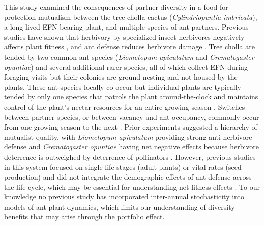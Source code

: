 \documentclass[11pt]{article}
\begin{document}
This study examined the consequences of partner diversity in a food-for-protection mutualism between the tree cholla cactus (\textit{Cylindriopuntia imbricata}), a long-lived EFN-bearing plant, and multiple species of ant partners.
Previous studies have shown that herbivory by specialized insect herbivores negatively affects plant fitness \cite{Miller2009}, and ant defense reduces herbivore damage \cite{Miller2007}. 
Tree cholla are tended by two common ant species (\textit{Liometopum apiculatum} and \textit{Crematogaster opuntiae}) and several additional rarer species, all of which collect EFN during foraging visits but their colonies are ground-nesting and not housed by the plants. 
These ant species locally co-occur but individual plants are typically tended by only one species that patrols the plant around-the-clock and maintains control of the plant's nectar resources for an entire growing season \citep{Ohm2014, Donald2022}. 
Switches between partner species, or between vacancy and ant occupancy, commonly occur from one growing season to the next \citep{Miller2007}. 
Prior experiments suggested a hierarchy of mutualist quality, with \textit{Liometopum apiculatum} providing strong anti-herbivore defense and \textit{Crematogaster opuntiae} having net negative effects because herbivore deterrence is outweighed by deterrence of pollinators \citep{Miller2007,Ohm2014}. 
However, previous studies in this system focused on single life stages (adult plants) or vital rates (seed production) and did not integrate the demographic effects of ant defense across the life cycle, which may be essential for understanding net fitness effects \citep[e.g.,][]{Palmer2010}. 
To our knowledge no previous study has incorporated inter-annual stochasticity into models of ant-plant dynamics, which limits our understanding of diversity benefits that may arise through the portfolio effect. 
\end{document}
